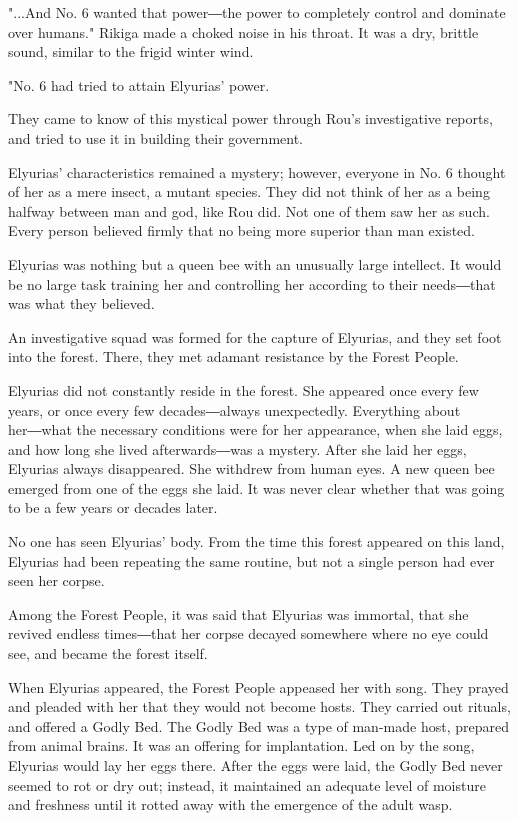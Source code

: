"...And No. 6 wanted that power―the power to completely control and
dominate over humans." Rikiga made a choked noise in his throat. It was
a dry, brittle sound, similar to the frigid winter wind.

"No. 6 had tried to attain Elyurias' power.

They came to know of this mystical power through Rou's investigative
reports, and tried to use it in building their government.

Elyurias' characteristics remained a mystery; however, everyone in No. 6
thought of her as a mere insect, a mutant species. They did not think of
her as a being halfway between man and god, like Rou did. Not one of
them saw her as such. Every person believed firmly that no being more
superior than man existed.

Elyurias was nothing but a queen bee with an unusually large intellect.
It would be no large task training her and controlling her according to
their needs―that was what they believed.

An investigative squad was formed for the capture of Elyurias, and they
set foot into the forest. There, they met adamant resistance by the
Forest People.

Elyurias did not constantly reside in the forest. She appeared once
every few years, or once every few decades―always unexpectedly.
Everything about her―what the necessary conditions were for her
appearance, when she laid eggs, and how long she lived afterwards―was a
mystery. After she laid her eggs, Elyurias always disappeared. She
withdrew from human eyes. A new queen bee emerged from one of the eggs
she laid. It was never clear whether that was going to be a few years or
decades later.

No one has seen Elyurias' body. From the time this forest appeared on
this land, Elyurias had been repeating the same routine, but not a
single person had ever seen her corpse.

Among the Forest People, it was said that Elyurias was immortal, that
she revived endless times―that her corpse decayed somewhere where no eye
could see, and became the forest itself.

When Elyurias appeared, the Forest People appeased her with song. They
prayed and pleaded with her that they would not become hosts. They
carried out rituals, and offered a Godly Bed. The Godly Bed was a type
of man-made host, prepared from animal brains. It was an offering for
implantation. Led on by the song, Elyurias would lay her eggs there.
After the eggs were laid, the Godly Bed never seemed to rot or dry out;
instead, it maintained an adequate level of moisture and freshness until
it rotted away with the emergence of the adult wasp.

